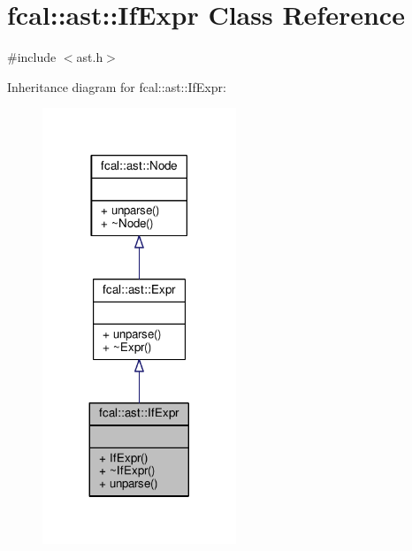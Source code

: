 \hypertarget{classfcal_1_1ast_1_1IfExpr}{}\section{fcal\+:\+:ast\+:\+:If\+Expr Class Reference}
\label{classfcal_1_1ast_1_1IfExpr}


{\ttfamily \#include $<$ast.\+h$>$}



Inheritance diagram for fcal\+:\+:ast\+:\+:If\+Expr\+:
\nopagebreak
\begin{figure}[H]
\begin{center}
\leavevmode
\includegraphics[width=164pt]{classfcal_1_1ast_1_1IfExpr__inherit__graph}
\end{center}
\end{figure}


